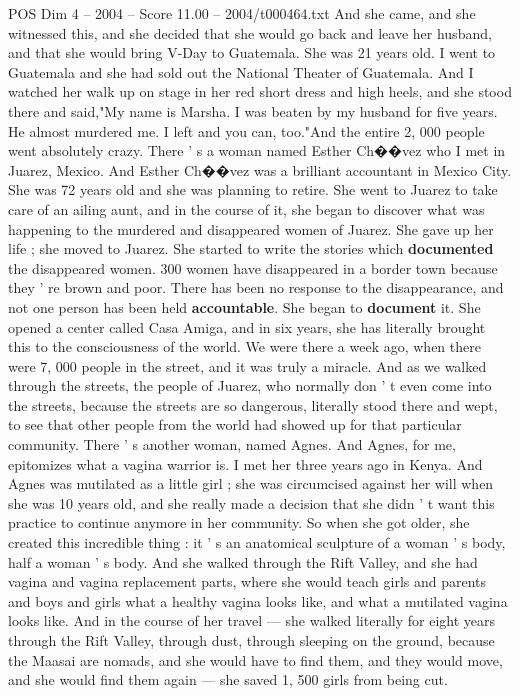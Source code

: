 \begin{textsample}{POS Dim 4 – 2004 – Score 11.00 – 2004/t000464.txt}
And she came, and she witnessed this, and she decided that she would go back and leave her husband, and that she would bring V-Day to Guatemala.
She was 21 years old.
I went to Guatemala and she had sold out the National Theater of Guatemala.
And I watched her walk up on stage in her red short dress and high heels, and she stood there and said,"My name is Marsha.
I was beaten by my husband for five years.
He almost murdered me.
I left and you can, too."And the entire 2, 000 people went absolutely crazy.
There ' s a woman named Esther Ch{\EmojiFont �}{\EmojiFont �}vez who I met in Juarez, Mexico.
And Esther Ch{\EmojiFont �}{\EmojiFont �}vez was a brilliant accountant in Mexico City.
She was 72 years old and she was planning to retire.
She went to Juarez to take care of an ailing aunt, and in the course of it, she began to discover what was happening to the murdered and disappeared women of Juarez.
She gave up her life ; she moved to Juarez.
She started to write the stories which \textbf{documented} the disappeared women. 300 women have disappeared in a border town because they ' re brown and poor.
There has been no response to the disappearance, and not one person has been held \textbf{accountable}.
She began to \textbf{document} it.
She opened a center called Casa Amiga, and in six years, she has literally brought this to the consciousness of the world.
We were there a week ago, when there were 7, 000 people in the street, and it was truly a miracle.
And as we walked through the streets, the people of Juarez, who normally don ' t even come into the streets, because the streets are so dangerous, literally stood there and wept, to see that other people from the world had showed up for that particular community.
There ' s another woman, named Agnes.
And Agnes, for me, epitomizes what a vagina warrior is.
I met her three years ago in Kenya.
And Agnes was mutilated as a little girl ; she was circumcised against her will when she was 10 years old, and she really made a decision that she didn ' t want this practice to continue anymore in her community.
So when she got older, she created this incredible thing : it ' s an anatomical sculpture of a woman ' s body, half a woman ' s body.
And she walked through the Rift Valley, and she had vagina and vagina replacement parts, where she would teach girls and parents and boys and girls what a healthy vagina looks like, and what a mutilated vagina looks like.
And in the course of her travel — she walked literally for eight years through the Rift Valley, through dust, through sleeping on the ground, because the Maasai are nomads, and she would have to find them, and they would move, and she would find them again — she saved 1, 500 girls from being cut.

\end{textsample}
